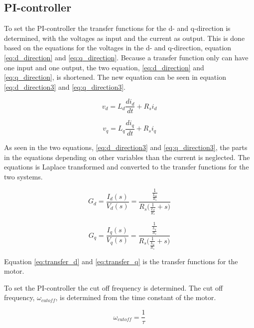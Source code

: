 \subsection{PI-controller}

To set the PI-controller the transfer functions for the d- and q-direction is determined, with the voltages as input and the current as output. This is done based on the equations for the voltages in the d- and q-direction, equation \ref{eq:d_direction} and \ref{eq:q_direction}.
Because a transfer function only can have one input and one output, the two equation, \ref{eq:d_direction} and \ref{eq:q_direction}, is shortened. The new equation can be seen in equation \ref{eq:d_direction3} and \ref{eq:q_direction3}.

\begin{equation}
    \label{eq:d_direction3}
    v_d = L_d \frac{d i_d}{dt} + R_s i_d
\end{equation}

\begin{equation}
    \label{eq:q_direction3}
    v_q = L_q \frac{d i_q}{dt} + R_s i_q
\end{equation}

As seen in the two equations, \ref{eq:d_direction3} and \ref{eq:q_direction3}, the parts in the equations depending on other variables than the current is neglected. 
The equations is Laplace transformed and converted to the transfer functions for the two systems.

\begin{equation}
    \label{eq:transfer_d}
    G_d = \frac{I_d(s)}{V_d(s)} = \frac{ \frac{1}{ \frac{L_d}{R_s} } }{ R_s \bigg(\frac{1}{ \frac{L_d}{R_s} } + s \bigg) }
\end{equation}

\begin{equation}
    \label{eq:transfer_q}
    G_q = \frac{I_q(s)}{V_q(s)} = \frac{ \frac{1}{ \frac{L_q}{R_s} } }{ R_s \bigg(\frac{1}{ \frac{L_q}{R_s} } + s \bigg) }
\end{equation}

Equation \ref{eq:transfer_d} and \ref{eq:transfer_q} is the transfer functions for the motor.

To set the PI-controller the cut off frequency is determined. The cut off frequency, $\omega_{cutoff}$, is determined from the time constant of the motor.

\begin{equation}
    \omega_{cutoff} = \frac{1}{\tau}
\end{equation}

